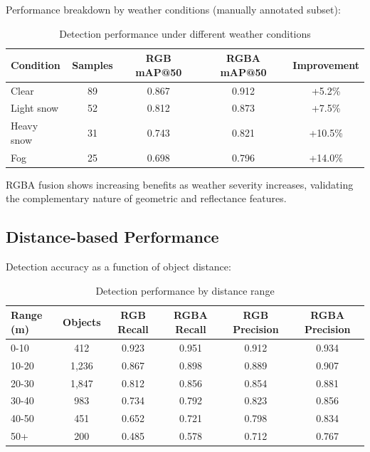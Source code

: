 Performance breakdown by weather conditions (manually annotated subset):

\begin{table}[h]
\centering
\caption{Detection performance under different weather conditions}
\begin{tabular}{lcccc}
\toprule
\textbf{Condition} & \textbf{Samples} & \textbf{RGB mAP@50} & \textbf{RGBA mAP@50} & \textbf{Improvement} \\
\midrule
Clear & 89 & 0.867 & 0.912 & +5.2\% \\
Light snow & 52 & 0.812 & 0.873 & +7.5\% \\
Heavy snow & 31 & 0.743 & 0.821 & +10.5\% \\
Fog & 25 & 0.698 & 0.796 & +14.0\% \\
\bottomrule
\end{tabular}
\end{table}

RGBA fusion shows increasing benefits as weather severity increases, validating the complementary nature of geometric and reflectance features.

\subsection{Distance-based Performance}

Detection accuracy as a function of object distance:

\begin{table}[h]
\centering
\caption{Detection performance by distance range}
\begin{tabular}{lccccc}
\toprule
\textbf{Range (m)} & \textbf{Objects} & \textbf{RGB Recall} & \textbf{RGBA Recall} & \textbf{RGB Precision} & \textbf{RGBA Precision} \\
\midrule
0-10 & 412 & 0.923 & 0.951 & 0.912 & 0.934 \\
10-20 & 1,236 & 0.867 & 0.898 & 0.889 & 0.907 \\
20-30 & 1,847 & 0.812 & 0.856 & 0.854 & 0.881 \\
30-40 & 983 & 0.734 & 0.792 & 0.823 & 0.856 \\
40-50 & 451 & 0.652 & 0.721 & 0.798 & 0.834 \\
50+ & 200 & 0.485 & 0.578 & 0.712 & 0.767 \\
\bottomrule
\end{tabular}
\end{table}


